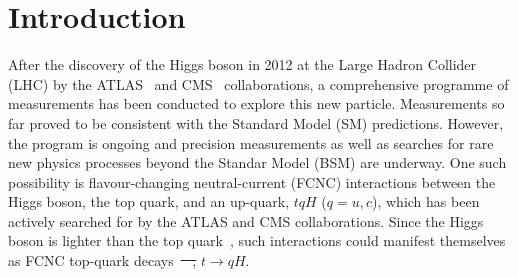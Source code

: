 \documentclass[PAPER, coverpage, atlasdraft=true, texlive=2016, UKenglish]{\ATLASLATEXPATH atlasdoc}
\author{The ATLAS Collaboration}
\providecommand{\DIFadd}[1]{{\protect\color{blue}\uwave{#1}}} %
\providecommand{\DIFdel}[1]{{\protect\color{red}\sout{#1}}}                      %
\providecommand{\DIFaddbegin}{} %
\providecommand{\DIFaddend}{} %
\providecommand{\DIFdelbegin}{} %
\providecommand{\DIFdelend}{} %
\begin{document}
\maketitle

\tableofcontents

\section{Introduction}
\label{sec:intro}
After the discovery of the Higgs boson in 2012 at the Large Hadron Collider (LHC) by the ATLAS~\cite{Aad:2012tfa} and 
CMS~\cite{Chatrchyan:2012ufa} collaborations, 
a comprehensive programme of measurements %
has been conducted to explore this new particle. Measurements so far proved to be consistent with the Standard Model (SM) predictions. 
However, the program is ongoing and precision measurements as well as searches for rare new physics processes beyond the Standar Model (BSM)
are underway. One such possibility is flavour-changing neutral-current (FCNC) interactions between the Higgs boson, 
the top quark, and an up-quark, $tqH$ ($q=u, c$), which has been actively searched for by the ATLAS and CMS collaborations.  
Since the Higgs boson is lighter than the top quark~\cite{Aad:2015zhl},
such interactions could manifest themselves as FCNC top-quark decays~\DIFdelbegin \DIFdel{\mbox{%
\cite{Agashe:2013hma}}\hspace{0pt}%
, }\DIFdelend \DIFaddbegin \DIFadd{(}\DIFaddend $t\to qH$\DIFaddbegin \DIFadd{)~\mbox{%
\cite{Agashe:2013hma}}\hspace{0pt}%
}\DIFaddend .  
\end{document}
